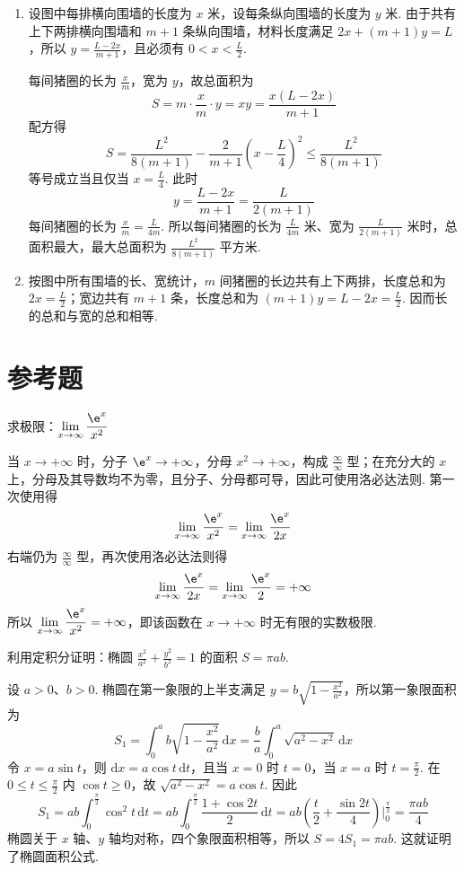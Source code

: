 \begin{solution}
\begin{enumerate}
\item 设图中每排横向围墙的长度为 \(x\) 米，设每条纵向围墙的长度为 \(y\) 米. 由于共有上下两排横向围墙和 \(m+1\) 条纵向围墙，材料长度满足
\(2x+(m+1)y=L\)，所以 \(y=\frac{L-2x}{m+1}\)，且必须有 \(0<x<\frac L2\).

每间猪圈的长为 \(\frac{x}{m}\)，宽为 \(y\)，故总面积为
\[
S=m\cdot\frac{x}{m}\cdot y=xy=\frac{x(L-2x)}{m+1}
\]
配方得
\[
S=\frac{L^2}{8(m+1)}-\frac{2}{m+1}\left( x-\frac L4 \right)^2\le \frac{L^2}{8(m+1)}
\]
等号成立当且仅当 \(x=\frac L4\). 此时
\[
y=\frac{L-2x}{m+1}=\frac{L}{2(m+1)}
\]
每间猪圈的长为 \(\frac{x}{m}=\frac{L}{4m}\).
所以每间猪圈的长为 \(\frac{L}{4m}\) 米、宽为 \(\frac{L}{2(m+1)}\) 米时，总面积最大，最大总面积为 \(\frac{L^2}{8(m+1)}\) 平方米.
\item 按图中所有围墙的长、宽统计，\(m\) 间猪圈的长边共有上下两排，长度总和为 \(2x=\frac L2\)；宽边共有 \(m+1\) 条，长度总和为 \((m+1)y=L-2x=\frac L2\). 因而长的总和与宽的总和相等.
\end{enumerate}
\end{solution}

\section{参考题}

\begin{problem}
求极限：\(\displaystyle\lim_{x\to\infty}\frac{\e^x}{x^2}\)
\end{problem}

\begin{solution}
当 \(x\to+\infty\) 时，分子 \(\e^x\to+\infty\)，分母 \(x^2\to+\infty\)，构成 \(\frac{\infty}{\infty}\) 型；在充分大的 \(x\) 上，分母及其导数均不为零，且分子、分母都可导，因此可使用洛必达法则. 第一次使用得
\[
\lim_{x\to\infty}\frac{\e^x}{x^2}=\lim_{x\to\infty}\frac{\e^x}{2x}
\]
右端仍为 \(\frac{\infty}{\infty}\) 型，再次使用洛必达法则得
\[
\lim_{x\to\infty}\frac{\e^x}{2x}=\lim_{x\to\infty}\frac{\e^x}{2}=+\infty
\]
所以
\(\displaystyle\lim_{x\to\infty}\frac{\e^x}{x^2}=+\infty\)，即该函数在 \(x\to+\infty\) 时无有限的实数极限.
\end{solution}

\begin{problem}
利用定积分证明：椭圆 \(\frac{x^2}{a^2}+\frac{y^2}{b^2}=1\) 的面积 \(S=\pi ab\).
\end{problem}

\begin{solution}
设 \(a>0\)、\(b>0\). 椭圆在第一象限的上半支满足
\(y=b\sqrt{1-\frac{x^2}{a^2}}\)，所以第一象限面积为
\[
S_1=\int_0^a b\sqrt{1-\frac{x^2}{a^2}}\,\mathrm{d}x=\frac ba\int_0^a\sqrt{a^2-x^2}\,\mathrm{d}x
\]
令 \(x=a\sin t\)，则 \(\mathrm{d}x=a\cos t\,\mathrm{d}t\)，且当 \(x=0\) 时 \(t=0\)，当 \(x=a\) 时 \(t=\frac\pi2\). 在 \(0\le t\le\frac\pi2\) 内 \(\cos t\ge0\)，故 \(\sqrt{a^2-x^2}=a\cos t\). 因此
\[
S_1=ab\int_0^{\frac\pi2}\cos^2t\,\mathrm{d}t=ab\int_0^{\frac\pi2}\frac{1+\cos2t}{2}\,\mathrm{d}t=ab\left(\frac t2+\frac{\sin2t}{4}\right)\bigg|_0^{\frac\pi2}=\frac{\pi ab}{4}
\]
椭圆关于 \(x\) 轴、\(y\) 轴均对称，四个象限面积相等，所以
\(S=4S_1=\pi ab\). 这就证明了椭圆面积公式.
\end{solution}
